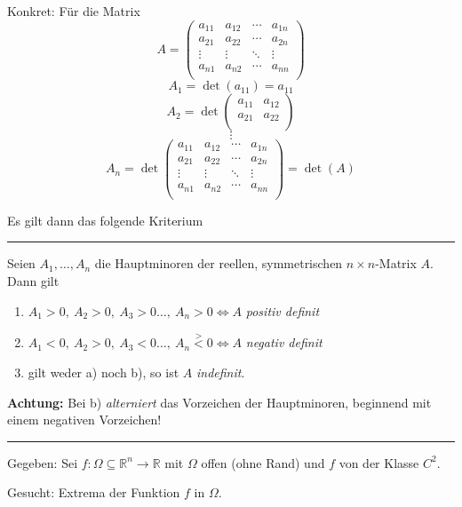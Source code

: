 \documentclass[a4paper,landscape,8pt]{extarticle}
\newcommand{\R}{\mathbb{R}}
\newcommand{\sep}{\vspace{5pt}\noindent\hrule\vspace{5pt}}
\newcommand{\Achtung}{\textbf{Achtung: }}
\begin{document}
\begin{multicols*}{4}
\begin{warmup}
Konkret: Für die Matrix
\[
A = \begin{pmatrix}
a_{11} & a_{12} & \cdots & a_{1n}\\
a_{21} & a_{22} & \cdots & a_{2n}\\
\vdots & \vdots & \ddots & \vdots\\
a_{n1} & a_{n2} & \cdots & a_{nn}\\
\end{pmatrix}
\]
\[
A_1 = \det(a_{11}) = a_{11}
\]
\[
A_2 = \det\begin{pmatrix}
a_{11} & a_{12}\\
a_{21} & a_{22}\\
\end{pmatrix}
\]
\[
\vdots
\]
\[
A_n = \det \begin{pmatrix}
a_{11} & a_{12} & \cdots & a_{1n}\\
a_{21} & a_{22} & \cdots & a_{2n}\\
\vdots & \vdots & \ddots & \vdots\\
a_{n1} & a_{n2} & \cdots & a_{nn}\\
\end{pmatrix}
= \det(A)
\]
\end{warmup}

Es gilt dann das folgende Kriterium

\sep

 Seien $A_1,\ldots,A_n$ die Hauptminoren der
reellen, symmetrischen $n\times n$-Matrix $A$. Dann gilt
\begin{enumerate}[label=\alph*)]
  \item $A_1 > 0, \ A_2 > 0, \ A_3 > 0 \ldots, \ A_n > 0 \Longleftrightarrow A$
  \emph{positiv definit}
  \item $A_1 < 0, \ A_2 > 0, \ A_3 < 0 \ldots, \ A_n \stackrel{>}{<} 0
  \Longleftrightarrow A$
  \emph{negativ definit}
  \item gilt weder a) noch b), so ist $A$ \emph{indefinit}.
\end{enumerate}

\Achtung Bei b) \emph{alterniert} das Vorzeichen der Hauptminoren, beginnend mit
einem negativen Vorzeichen!

\sep

\Vorgehen 

Gegeben: Sei $f\colon \Omega\subseteq\R^n\to\R$ mit $\Omega$ offen (ohne Rand)
und $f$ von der Klasse $C^2$.

Gesucht: Extrema der Funktion $f$ in $\Omega$.


\end{multicols*}
\end{document}
